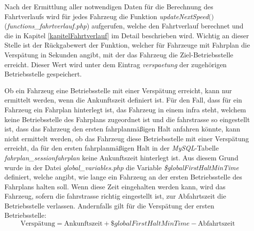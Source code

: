 Nach der Ermittlung aller notwendigen Daten für die Berechnung des Fahrtverlaufs wird für jedes Fahrzeug die Funktion \textit{updateNextSpeed$($$)$} (\textit{functions\_fahrtverlauf.php}) aufgerufen, welche den Fahrtverlauf berechnet und die in Kapitel \ref{kapitelFahrtverlauf} im Detail beschrieben wird. Wichtig an dieser Stelle ist der Rückgabewert der Funktion, welcher für Fahrzeuge mit Fahrplan die Verspätung in Sekunden angibt, mit der das Fahrzeug die Ziel-Betriebsstelle erreicht. Dieser Wert wird unter dem Eintrag \textit{verspaetung} der zugehörigen Betriebsstelle gespeichert. 

Ob ein Fahrzeug eine Betriebsstelle mit einer Verspätung erreicht, kann nur ermittelt werden, wenn die Ankunftszeit definiert ist. Für den Fall, dass für ein Fahrzeug ein Fahrplan hinterlegt ist, das Fahrzeug in einem \ac{infra} steht, welchem keine Betriebsstelle des Fahrplans zugeordnet ist und die \Gls{fahrstrasse} so eingestellt ist, dass das Fahrzeug den ersten fahrplanmäßigen Halt anfahren könnte, kann nicht ermittelt werden, ob das Fahrzeug diese Betriebsstelle mit einer Verspätung erreicht, da für den ersten fahrplanmäßigen Halt in der \textit{MySQL}-Tabelle \textit{fahrplan\_sessionfahrplan} keine Ankunftszeit hinterlegt ist. Aus diesem Grund wurde in der Datei \textit{global\_variables.php} die Variable \textit{\$globalFirstHaltMinTime} definiert, welche angibt, wie lange ein Fahrzeug an der ersten Betriebsstelle des Fahrplans halten soll. Wenn diese Zeit eingehalten werden kann, wird das Fahrzeug, sofern die \Gls{fahrstrasse} richtig eingestellt ist, zur Abfahrtszeit die Betriebsstelle verlassen. Andernfalls gilt für die Verspätung der ersten Betriebsstelle:
\begin{equation*}
\textrm{Verspätung} = \textrm{Ankunftszeit} + \textit{\$globalFirstHaltMinTime} - \textrm{Abfahrtszeit}
\end{equation*}
